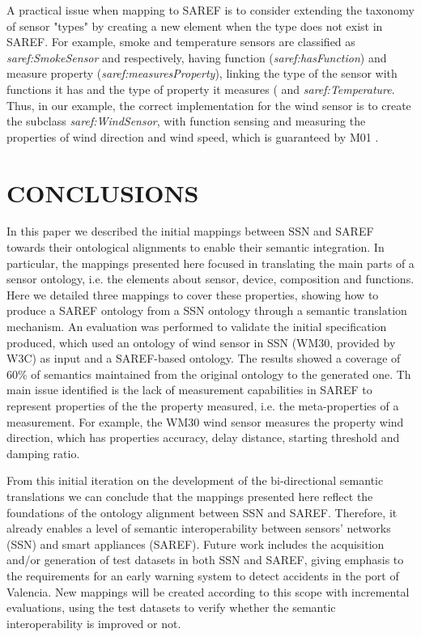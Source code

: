 \documentclass{sig-alternate-05-2015}
\begin{document}
A practical issue when mapping to SAREF is to consider extending the taxonomy of sensor "types" by creating a new element when the type does not exist in SAREF. For example, smoke and temperature sensors are classified as \textit{saref:SmokeSensor} and  respectively, having  function (\textit{saref:hasFunction}) and measure property (\textit{saref:measuresProperty}), linking the type of the sensor with functions it has and the type of property it measures ( and \textit{saref:Temperature}. Thus, in our example, the correct implementation for the wind sensor is to create the subclass \textit{saref:WindSensor}, with function sensing and measuring the properties of wind direction and wind speed, which is guaranteed by M01 \cite{bowman:reasoning,
clark:pct, braams:babel, herlihy:methodology}. 


\section{CONCLUSIONS}

In this paper we described the initial mappings between SSN and SAREF towards their ontological alignments to enable their semantic integration. In particular, the mappings presented here focused in translating the main parts of a sensor ontology, i.e. the elements about sensor, device, composition and functions. Here we detailed three mappings to cover these properties, showing how to produce a SAREF ontology from a SSN ontology through a semantic translation mechanism. An evaluation was performed to validate the initial specification produced, which used an ontology of wind sensor in SSN (WM30, provided by W3C) as input and a SAREF-based ontology. The results showed a coverage of 60\% of semantics maintained from the original ontology to the generated one. Th main issue identified is the lack of measurement capabilities in SAREF to represent properties of the the property measured, i.e. the meta-properties of a measurement. For example, the WM30 wind sensor measures the property wind direction, which has properties accuracy, delay distance, starting threshold and damping ratio. 

From this initial iteration on the development of the bi-directional semantic translations we can conclude that the mappings presented here reflect the foundations of the ontology alignment between SSN and SAREF. Therefore, it already enables a level of semantic interoperability between sensors' networks (SSN) and smart appliances (SAREF). Future work includes the acquisition and/or generation of test datasets in both SSN and SAREF, giving emphasis to the requirements for an early warning system \cite{Moreira2017} to detect accidents in the port of Valencia. New mappings will be created according to this scope with incremental evaluations, using the test datasets to verify whether the semantic interoperability is improved or not.  
\end{document}

